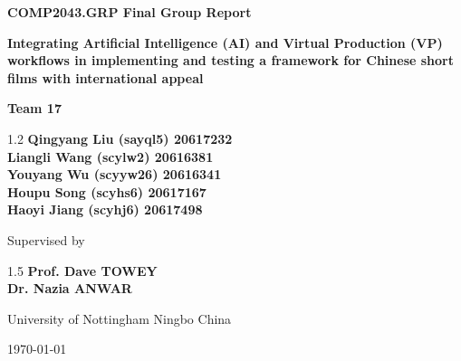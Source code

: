 \documentclass[12pt,a4paper]{report}
\begin{document}
\begin{titlepage}
    \centering
    \vspace*{2cm}
    
    
    {\large\bfseries COMP2043.GRP Final Group Report\par}
    \vspace{1.5cm}
    
    {\Large \textbf{Integrating Artificial Intelligence (AI) and Virtual Production (VP) workflows in implementing and testing a framework for Chinese short films with international appeal}\par}
    \vspace{1cm}
    
    {\Large \textbf{Team 17}\par}
    \vspace{0.4cm}
    
    \begin{spacing}{1.2}
    \large\textbf{Qingyang Liu (sayql5) 20617232} \\
    \large\textbf{Liangli Wang (scylw2) 20616381} \\
    \large\textbf{Youyang Wu (scyyw26) 20616341} \\
    \large\textbf{Houpu Song (scyhs6) 20617167} \\
    \large\textbf{Haoyi Jiang (scyhj6) 20617498} \\
    \end{spacing}
    \vspace{1cm}
    
    {\Large Supervised by\par}
    \begin{spacing}{1.5}
    \large\textbf{Prof. Dave TOWEY} \\
    \large\textbf{Dr. Nazia ANWAR} \\
    \end{spacing}
    
    \vfill
    {\large University of Nottingham Ningbo China \par}
    \vspace{0.15cm}
    {\large \today\par}
\end{titlepage}
\end{document}
